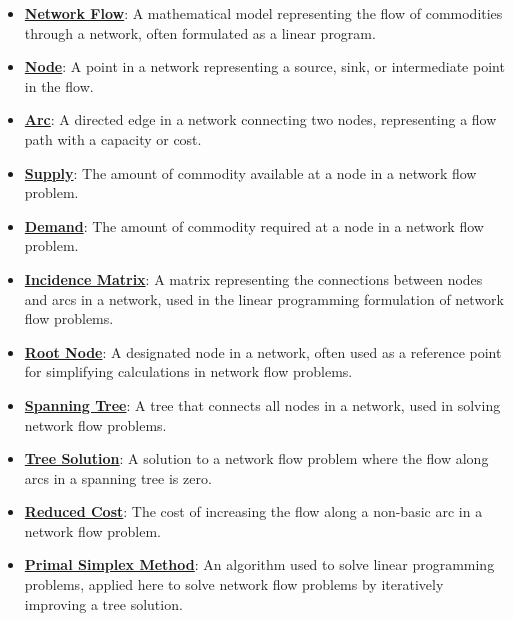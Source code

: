 \documentclass{article}%
\begin{document}
\begin{itemize}[leftmargin=*]%
\item \href{https://www.math.purdue.edu/~yipn/421/2024-11-05-NetFlows.pdf#page=1}{\textbf{Network Flow}}: A mathematical model representing the flow of commodities through a network, often formulated as a linear program.%
\item \href{https://www.math.purdue.edu/~yipn/421/2024-11-05-NetFlows.pdf#page=1}{\textbf{Node}}: A point in a network representing a source, sink, or intermediate point in the flow.%
\item \href{https://www.math.purdue.edu/~yipn/421/2024-11-05-NetFlows.pdf#page=1}{\textbf{Arc}}: A directed edge in a network connecting two nodes, representing a flow path with a capacity or cost.%
\item \href{https://www.math.purdue.edu/~yipn/421/2024-11-05-NetFlows.pdf#page=2}{\textbf{Supply}}: The amount of commodity available at a node in a network flow problem.%
\item \href{https://www.math.purdue.edu/~yipn/421/2024-11-05-NetFlows.pdf#page=2}{\textbf{Demand}}: The amount of commodity required at a node in a network flow problem.%
\item \href{https://www.math.purdue.edu/~yipn/421/2024-11-05-NetFlows.pdf#page=4}{\textbf{Incidence Matrix}}: A matrix representing the connections between nodes and arcs in a network, used in the linear programming formulation of network flow problems.%
\item \href{https://www.math.purdue.edu/~yipn/421/2024-11-05-NetFlows.pdf#page=6}{\textbf{Root Node}}: A designated node in a network, often used as a reference point for simplifying calculations in network flow problems.%
\item \href{https://www.math.purdue.edu/~yipn/421/2024-11-05-NetFlows.pdf#page=10}{\textbf{Spanning Tree}}: A tree that connects all nodes in a network, used in solving network flow problems.%
\item \href{https://www.math.purdue.edu/~yipn/421/2024-11-05-NetFlows.pdf#page=11}{\textbf{Tree Solution}}: A solution to a network flow problem where the flow along arcs in a spanning tree is zero.%
\item \href{https://www.math.purdue.edu/~yipn/421/2024-11-05-NetFlows.pdf#page=22}{\textbf{Reduced Cost}}: The cost of increasing the flow along a non-basic arc in a network flow problem.%
\item \href{https://www.math.purdue.edu/~yipn/421/2024-11-05-NetFlows.pdf#page=22}{\textbf{Primal Simplex Method}}: An algorithm used to solve linear programming problems, applied here to solve network flow problems by iteratively improving a tree solution.%

\end{itemize}
\end{document}
